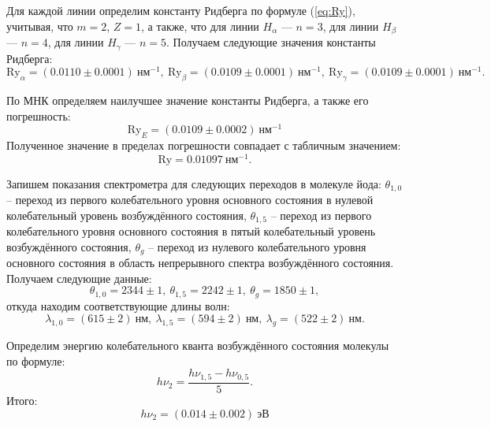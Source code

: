 \documentclass[a4paper,12pt]{article} %
\begin{document}
		
		Для каждой линии определим константу Ридберга по формуле (\ref{eq:Ry}), учитывая, что $m=2$, $Z=1$, а также, что для линии $H_{\alpha}$ --- $n=3$, для линии $H_{\beta}$ --- $n=4$, для линии $H_{\gamma}$ --- $n=5$. Получаем следующие значения константы Ридберга:
		\begin{equation*}
			\text{Ry}_{\alpha}=(0.0110 \pm 0.0001) \ \text{нм}^{-1}, \ \text{Ry}_{\beta} =( 0.0109 \pm 0.0001)\ \text{нм}^{-1}, \ \text{Ry}_{\gamma}=(0.0109 \pm 0.0001) \ \text{нм}^{-1}.
		\end{equation*}
	
		По МНК определяем наилучшее значение константы Ридберга, а также его погрешность:
		\[\boxed{\text{Ry}_E=(0.0109\pm 0.0002) \ \text{нм}^{-1}}\]
		Полученное значение в пределах погрешности совпадает с табличным значением: $$\text{Ry}=0.01097 \ \text{нм}^{-1}.$$
		
		Запишем показания спектрометра для следующих переходов в молекуле йода: $\theta_{1,0}$ -- переход из первого колебательного уровня основного состояния в нулевой колебательный уровень возбуждённого состояния,  $\theta_{1,5}$ -- переход из первого колебательного уровня основного состояния в пятый колебательный уровень возбуждённого состояния, $\theta_{g}$ -- переход из нулевого колебательного уровня основного состояния в область непрерывного спектра возбуждённого состояния. Получаем следующие данные:
		\begin{equation*}
			\theta_{1,0}=2344 \pm 1, \ \theta_{1,5}=2242 \pm 1, \ \theta_g=1850 \pm 1,
		\end{equation*}
		 откуда находим соответствующие длины волн: 
		 \begin{equation*}
		 	\lambda_{1,0}=(615 \pm 2) \ \text{нм}, \ \lambda_{1,5}=(594 \pm 2) \ \text{нм}, \ \lambda_g=(522 \pm 2)\ \text{нм}.
		 \end{equation*}
		
		Определим энергию колебательного кванта возбуждённого состояния молекулы по формуле: 
		\begin{equation*}
			h \nu_2=\dfrac{h\nu_{1,5}-h \nu_{0,5}}{5}.
		\end{equation*}
		Итого:
		\begin{equation*}
			h\nu_2=(0.014\pm 0.002) \ \text{эВ}
		\end{equation*}
			
\end{document}

